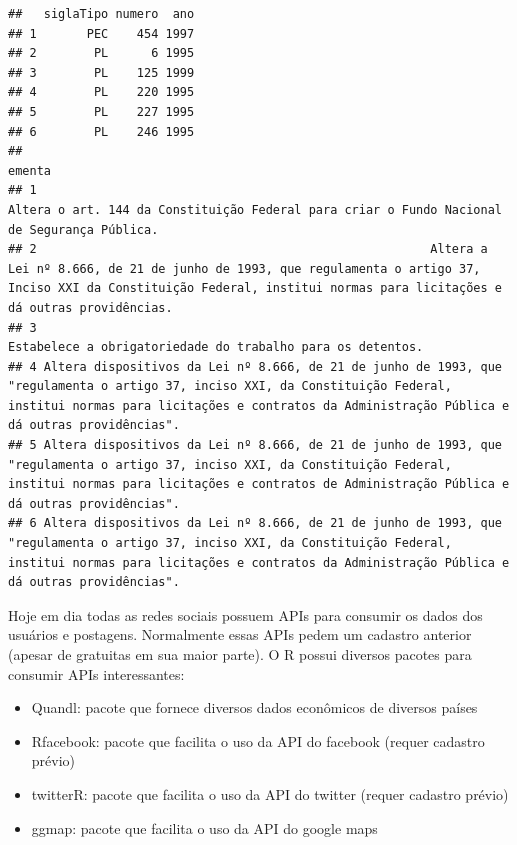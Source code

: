 \documentclass[]{book}
\providecommand{\tightlist}{%
  \setlength{\itemsep}{0pt}\setlength{\parskip}{0pt}}
\begin{document}
\begin{verbatim}
##   siglaTipo numero  ano
## 1       PEC    454 1997
## 2        PL      6 1995
## 3        PL    125 1999
## 4        PL    220 1995
## 5        PL    227 1995
## 6        PL    246 1995
##                                                                                                                                                                                                                            ementa
## 1                                                                                                                                     Altera o art. 144 da Constituição Federal para criar o Fundo Nacional de Segurança Pública.
## 2                                                       Altera a Lei nº 8.666, de 21 de junho de 1993, que regulamenta o artigo 37, Inciso XXI da Constituição Federal, institui normas para licitações e dá outras providências.
## 3                                                                                                                                                                      Estabelece a obrigatoriedade do trabalho para os detentos.
## 4 Altera dispositivos da Lei nº 8.666, de 21 de junho de 1993, que "regulamenta o artigo 37, inciso XXI, da Constituição Federal, institui normas para licitações e contratos da Administração Pública e dá outras providências".
## 5 Altera dispositivos da Lei nº 8.666, de 21 de junho de 1993, que "regulamenta o artigo 37, inciso XXI, da Constituição Federal, institui normas para licitações e contratos de Administração Pública e dá outras providências".
## 6 Altera dispositivos da Lei nº 8.666, de 21 de junho de 1993, que "regulamenta o artigo 37, inciso XXI, da Constituição Federal, institui normas para licitações e contratos da Administração Pública e dá outras providências".
\end{verbatim}

Hoje em dia todas as redes sociais possuem APIs para consumir os dados
dos usuários e postagens. Normalmente essas APIs pedem um cadastro
anterior (apesar de gratuitas em sua maior parte). O R possui diversos
pacotes para consumir APIs interessantes:

\begin{itemize}
\tightlist
\item
  Quandl: pacote que fornece diversos dados econômicos de diversos
  países
\item
  Rfacebook: pacote que facilita o uso da API do facebook (requer
  cadastro prévio)
\item
  twitterR: pacote que facilita o uso da API do twitter (requer cadastro
  prévio)
\item
  ggmap: pacote que facilita o uso da API do google maps
\end{itemize}
\end{document}
